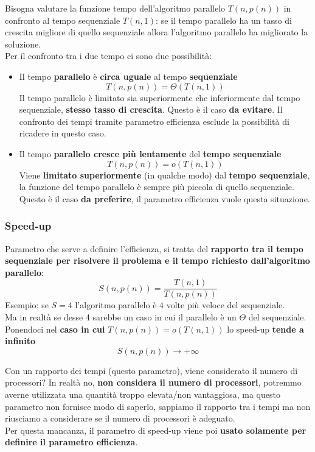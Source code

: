 Bisogna valutare la funzione tempo dell'algoritmo parallelo $T(n, p(n))$ in confronto al tempo sequenziale $T(n,1)$: se il tempo parallelo ha un tasso di crescita migliore di quello sequenziale allora l'algoritmo parallelo ha migliorato la soluzione.\\
Per il confronto tra i due tempo ci sono due possibilità:
\begin{itemize}
	\item Il tempo \textbf{parallelo} è \textbf{circa uguale} al tempo \textbf{sequenziale}
	$$ T(n, p(n)) = \Theta(T(n,1))$$
	Il tempo parallelo è limitato sia superiormente che inferiormente dal tempo sequenziale, \textbf{stesso tasso di crescita}. Questo è il caso \textbf{da evitare}. Il confronto dei tempi tramite parametro efficienza esclude la possibilità di ricadere in questo caso.\\
	
	\item Il tempo \textbf{parallelo cresce più lentamente} del \textbf{tempo sequenziale}
	$$ T(n, p(n)) = o (T(n,1))$$
	Viene \textbf{limitato superiormente} (in qualche modo) dal \textbf{tempo sequenziale}, la funzione del tempo parallelo è sempre più piccola di quello sequenziale. Questo è il caso \textbf{da preferire}, il parametro efficienza vuole questa situazione.\\
\end{itemize}

\newpage

\subsubsection{Speed-up}
Parametro che serve a definire l'efficienza, si tratta del \textbf{rapporto tra il tempo sequenziale per risolvere il problema e il tempo richiesto dall'algoritmo parallelo}:
$$ S(n, p(n)) = \frac{T(n,1)}{T(n,p(n))} $$
Esempio: se $S=4$ l'algoritmo parallelo è $4$ volte più veloce del sequenziale.\\

Ma in realtà se desse 4 sarebbe un caso in cui il parallelo è un $\Theta$ del sequenziale. Ponendoci nel \textbf{caso in cui} $T(n, p(n)) = o (T(n, 1))$ lo speed-up \textbf{tende a infinito}
$$ S(n, p(n)) \rightarrow + \infty $$

Con un rapporto dei tempi (questo parametro), viene considerato il numero di processori? In realtà no, \textbf{non considera il numero di processori}, potremmo averne utilizzata una quantità troppo elevata/non vantaggiosa, ma questo parametro non fornisce modo di saperlo, sappiamo il rapporto tra i tempi ma non riusciamo a considerare se il numero di processori è adeguato.\\
Per questa mancanza, il parametro di speed-up viene poi \textbf{usato solamente per definire il parametro efficienza}. \\

